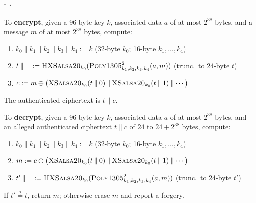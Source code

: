 \documentclass[draft]{article}
\newcommand{\term}[1]{\textbf{#1}}
\def\operatorsc#1{{%
  \ifmmode\let\next=\operatorname\else\let\next=\relax\fi\next{\textsc{#1}}}}
\def\Salsa#1/{\operatorsc{Salsa#1}}
\def\XSalsa#1/{\operatorsc{XSalsa#1}}
\def\HXSalsa#1/{\operatorsc{HXSalsa#1}}
\def\Poly#1/{\operatorsc{Poly#1}}
\def\Daence/{\operatorsc{Daence}}
\newcommand{\concat}{\mathbin\|}
\begin{document}
\paragraph*{\Salsa20/-\Daence/.}
To \term{encrypt}, given
 a 96-byte key $k$,
 associated data $a$ of at most $2^{38}$ bytes, and
 a message $m$ of at most $2^{38}$ bytes,
 compute:
%
\begin{enumerate}
  \item $k_0 \concat k_1 \concat k_2 \concat k_3 \concat k_4 := k$
    \hfill (32-byte $k_0$; 16-byte $k_1, \dotsc, k_4$)
  \item $t \concat \_ :=
      \HXSalsa20/_{k_0}(\Poly1305/^2_{k_1,k_2,k_3,k_4}(a, m))$
    \hfill (trunc.\ to 24-byte $t$)
  \item $c := m \oplus \bigl(\XSalsa20/_{k_0}(t \concat 0) \concat
      \XSalsa20/_{k_0}(t \concat 1) \concat \dotsb\bigr)$
\end{enumerate}
%
The authenticated ciphertext is $t \concat c$.

To \term{decrypt}, given
 a 96-byte key $k$,
 associated data $a$ of at most $2^{38}$ bytes, and
 an alleged authenticated ciphertext $t \concat c$ of $24$
 to $24 + 2^{38}$ bytes, compute:
%
\begin{enumerate}
  \item $k_0 \concat k_1 \concat k_2 \concat k_3 \concat k_4 := k$
    \hfill (32-byte $k_0$; 16-byte $k_1, \dotsc, k_4$)
  \item $m := c \oplus \bigl(\XSalsa20/_{k_0}(t \concat 0) \concat
      \XSalsa20/_{k_0}(t \concat 1) \concat \dotsb\bigr)$
  \item $t' \concat \_ :=
      \HXSalsa20/_{k_0}(\Poly1305/^2_{k_1,k_2,k_3,k_4}(a, m))$
    \hfill (trunc.\ to 24-byte $t'$)
\end{enumerate}
%
If $t' \stackrel?= t$, return $m$; otherwise erase $m$ and report a
 forgery.
\end{document}
